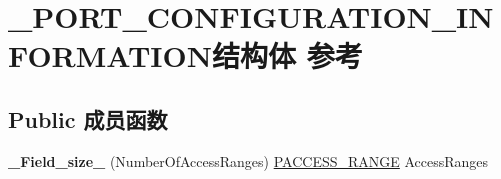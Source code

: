 \hypertarget{struct___p_o_r_t___c_o_n_f_i_g_u_r_a_t_i_o_n___i_n_f_o_r_m_a_t_i_o_n}{}\section{\+\_\+\+P\+O\+R\+T\+\_\+\+C\+O\+N\+F\+I\+G\+U\+R\+A\+T\+I\+O\+N\+\_\+\+I\+N\+F\+O\+R\+M\+A\+T\+I\+O\+N结构体 参考}
\label{struct___p_o_r_t___c_o_n_f_i_g_u_r_a_t_i_o_n___i_n_f_o_r_m_a_t_i_o_n}
\subsection*{Public 成员函数}
\begin{DoxyCompactItemize}
\item 
\mbox{\label{struct___p_o_r_t___c_o_n_f_i_g_u_r_a_t_i_o_n___i_n_f_o_r_m_a_t_i_o_n_a1d2a37a9af84923feb8f77c7a81a2e77}} 
{\bfseries \+\_\+\+Field\+\_\+size\+\_\+} (Number\+Of\+Access\+Ranges) \hyperlink{struct___a_c_c_e_s_s___r_a_n_g_e}{P\+A\+C\+C\+E\+S\+S\+\_\+\+R\+A\+N\+GE} Access\+Ranges
\end{DoxyCompactItemize}
